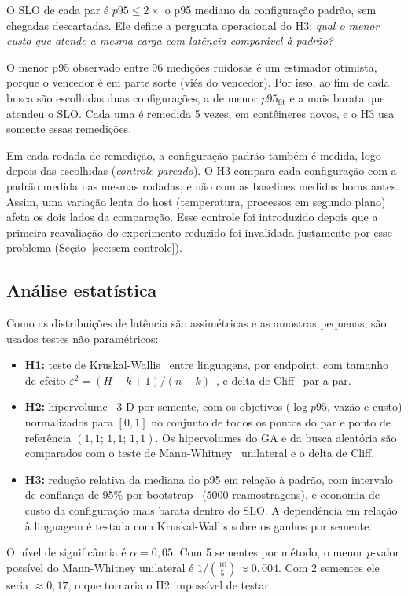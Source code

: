 \documentclass[11pt,a4paper]{article}
\begin{document}
O SLO de cada par é $p95 \le 2 \times$ o p95 mediano da configuração padrão, sem chegadas descartadas. Ele define a
pergunta operacional do H3: \emph{qual o menor custo que atende a mesma carga com latência comparável à padrão?}

O menor p95 observado entre 96 medições ruidosas é um estimador otimista, porque o vencedor é em parte sorte (viés
do vencedor). Por isso, ao fim de cada busca são escolhidas duas configurações, a de menor $p95_{\text{fit}}$ e a mais
barata que atendeu o SLO. Cada uma é remedida 5 vezes, em contêineres novos, e o H3 usa somente essas remedições.

Em cada rodada de remedição, a configuração padrão também é medida, logo depois das escolhidas (\emph{controle pareado}).
O H3 compara cada configuração com a padrão medida nas mesmas rodadas, e não com as baselines medidas horas antes.
Assim, uma variação lenta do host (temperatura, processos em segundo plano) afeta os dois lados da comparação. Esse
controle foi introduzido depois que a primeira reavaliação do experimento reduzido foi invalidada justamente por esse
problema (Seção~\ref{sec:sem-controle}).

\subsection{Análise estatística}

Como as distribuições de latência são assimétricas e as amostras pequenas, são usados testes não paramétricos:
\begin{itemize}
  \item \textbf{H1:} teste de Kruskal-Wallis~\cite{kruskal1952} entre linguagens, por endpoint, com tamanho de efeito
    $\varepsilon^2 = (H - k + 1)/(n - k)$~\cite{tomczak2014}, e delta de Cliff~\cite{cliff1993} par a par.
  \item \textbf{H2:} hipervolume~\cite{zitzler1999} 3-D por semente, com os objetivos ($\log p95$, vazão e custo) normalizados
    para $[0,1]$ no conjunto de todos os pontos do par e ponto de referência $(1{,}1;\,1{,}1;\,1{,}1)$. Os hipervolumes do
    GA e da busca aleatória são comparados com o teste de Mann-Whitney~\cite{mann1947} unilateral e o delta de Cliff.
  \item \textbf{H3:} redução relativa da mediana do p95 em relação à padrão, com intervalo de confiança de 95\% por
    bootstrap~\cite{efron1979} (5000 reamostragens), e economia de custo da configuração mais barata dentro do SLO.
    A dependência em relação à linguagem é testada com Kruskal-Wallis sobre os ganhos por semente.
\end{itemize}
O nível de significância é $\alpha = 0{,}05$. Com 5 sementes por método, o menor $p$-valor possível do Mann-Whitney
unilateral é $1/\binom{10}{5} \approx 0{,}004$. Com 2 sementes ele seria $\approx 0{,}17$, o que tornaria o H2 impossível de testar.
\end{document}
